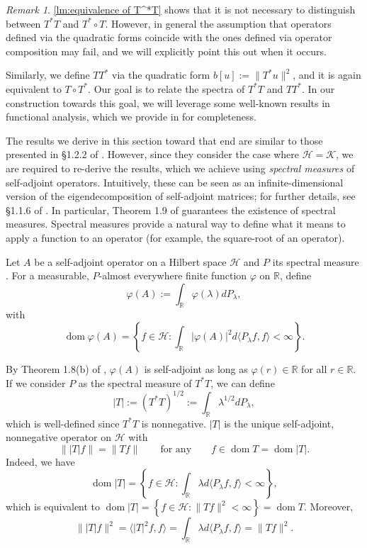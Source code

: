 \documentclass[11pt]{article}
\theoremstyle{definition}
\theoremstyle{remark}
\newtheorem{remark}[theorem]{Remark}
\DeclareMathOperator\dom{dom}
\newcommand{\Hh}{\mathcal{H}}
\newcommand{\Kk}{\mathcal{K}}
\newcommand{\R}{\mathbb{R}}
\begin{document}
\begin{remark}\label{remark:not always equivalent}
    \cref{lm:equivalence of T^*T} shows that it is not necessary to distinguish between $T^*T$ and $T^*\circ T$. However, in general the assumption that operators defined via the quadratic forms coincide with the ones defined via operator composition may fail, and we will explicitly point this out when it occurs.
\end{remark}

Similarly, we define $TT^*$ via the quadratic form $b[u]:=\|T^*u\|^2$, and it is again equivalent to $T\circ T^*$. Our goal is to relate the spectra of $T^*T$ and $TT^*$.  In our construction towards this goal, we will leverage some well-known results in functional analysis, which we provide in  for completeness.

The results we derive in this section toward that end are similar to those presented in \S1.2.2 of \citet{schroedingerop}. However, since they consider the case where $\Hh=\Kk$, we are required to re-derive the results, which we achieve using \emph{spectral measures} of self-adjoint operators. Intuitively, these can be seen as an infinite-dimensional version of the eigendecomposition of self-adjoint matrices; for further details, see \S1.1.6 of \citet{schroedingerop}. In particular, Theorem 1.9 of \cite{schroedingerop} guarantees the existence of spectral measures. Spectral measures provide a natural way to define what it means to apply a function to an operator (for example, the square-root of an operator). 

    Let $A$ be a self-adjoint operator on a Hilbert space $\mathcal{H}$ and $P$ its spectral measure \citep[see][pp.~17-22]{schroedingerop}. For a measurable, $P$-almost everywhere finite function $\varphi$ on $\mathbb{R}$, define
    $$
    \varphi(A):=\int_\mathbb{R} \varphi(\lambda) dP_\lambda,
    $$
    with
    $$
    \dom \varphi(A)=\left\{f\in \mathcal{H}:\int_{\mathbb{R}}|\varphi(A)|^2d\langle P_\lambda f,f\rangle<\infty\right\}.
    $$

By Theorem 1.8(b) of \citet{schroedingerop}, $\varphi(A)$ is self-adjoint as long as $\varphi(r) \in \R$ for all $r \in \R$.  If we consider $P$ as the spectral measure of $T^*T$, we can define
$$
|T|:=(T^*T)^{1/2}:=\int_\mathbb{R}\lambda^{1/2}dP_\lambda,
$$
which is well-defined since $T^*T$ is nonnegative. $|T|$ is the unique self-adjoint, nonnegative operator on $\mathcal{H}$ with
\begin{equation*}
    \||T|f\|=\|Tf\|\qquad \text{for any}\qquad f\in\dom T=\dom|T|.
\end{equation*}
Indeed, we have
$$\dom |T|=\left\{f\in \mathcal{H}:\int_{\mathbb{R}}\lambda d\langle P_\lambda f,f\rangle<\infty\right\},$$
which is equivalent to 
$\dom |T|=\left\{f\in \mathcal{H}:\|Tf\|^2<\infty\right\}=\dom T.$
Moreover,
$$\||T|f\|^2=\langle|T|^2f,f\rangle=\int_{\mathbb{R}}\lambda d\langle P_\lambda f,f\rangle=\|Tf\|^2.$$
\end{document}
